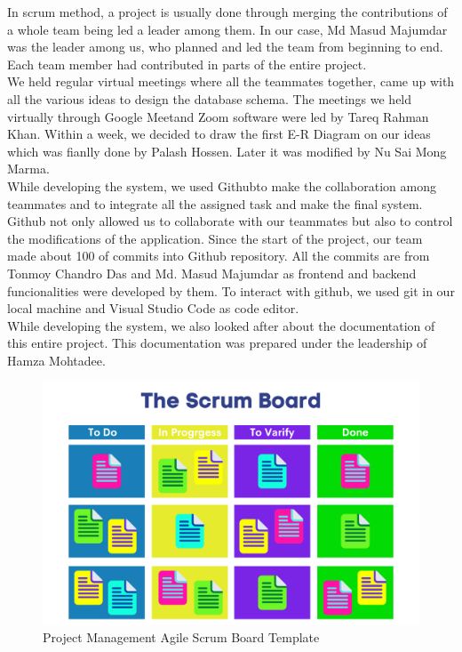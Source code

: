 \begin{enumerate}
In scrum method, a project is usually done through merging the contributions of a whole team being led a leader among them. In our case, Md Masud Majumdar was the leader among us, who planned and led the team from beginning to end. Each team member had contributed in parts of the entire project.\\

We held regular virtual meetings where all the teammates together, came up with all the various ideas to design the database schema. The meetings we held virtually through Google Meet\footnotemark and Zoom software were led by Tareq Rahman Khan. Within a week, we decided to draw the first E-R Diagram on our ideas which was fianlly done by Palash Hossen. Later it was modified by Nu Sai Mong Marma.\\

While developing the system, we used Github\footnotemark to make the collaboration among teammates and to integrate all the assigned task and make the final system. Github not only allowed us to collaborate with our teammates but also to control the modifications of the application. Since the start of the project, our team made about 100 of commits into Github repository. All the commits are from Tonmoy Chandro Das and Md. Masud Majumdar as frontend and backend funcionalities were developed by them. To interact with github, we used git in our local machine and Visual Studio Code as code editor.\\

While developing the system, we also looked after about the documentation of this entire project. This documentation was prepared under the leadership of Hamza Mohtadee.\\

\begin{figure}[H]
    \centering
    \includegraphics[width=1\textwidth]{images/scrum_board}
    \caption{Project Management Agile Scrum Board Template}
    \label{fig:scrum_board}
\end{figure}


\end{enumerate}

